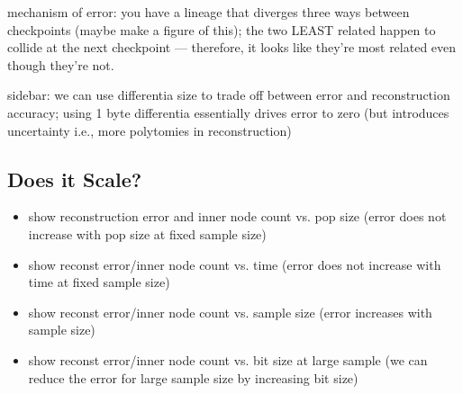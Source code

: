 mechanism of error: you have a lineage that diverges three ways between checkpoints (maybe make a figure of this); the two LEAST related happen to collide at the next checkpoint --- therefore, it looks like they're most related even though they're not.

sidebar: we can use differentia size to trade off between error and reconstruction accuracy; using 1 byte differentia essentially drives error to zero (but introduces uncertainty i.e., more polytomies in reconstruction)

\subsection{Does it Scale?} \label{sec:scaling}




\begin{itemize}
    \item show reconstruction error and inner node count vs. pop size (error does not increase with pop size at fixed sample size)
    \item show reconst error/inner node count vs. time (error does not increase with time at fixed sample size)
    \item show reconst error/inner node count vs. sample size (error increases with sample size)
    \item show reconst error/inner node count vs. bit size at large sample (we can reduce the error for large sample size by increasing bit size)
\end{itemize}
